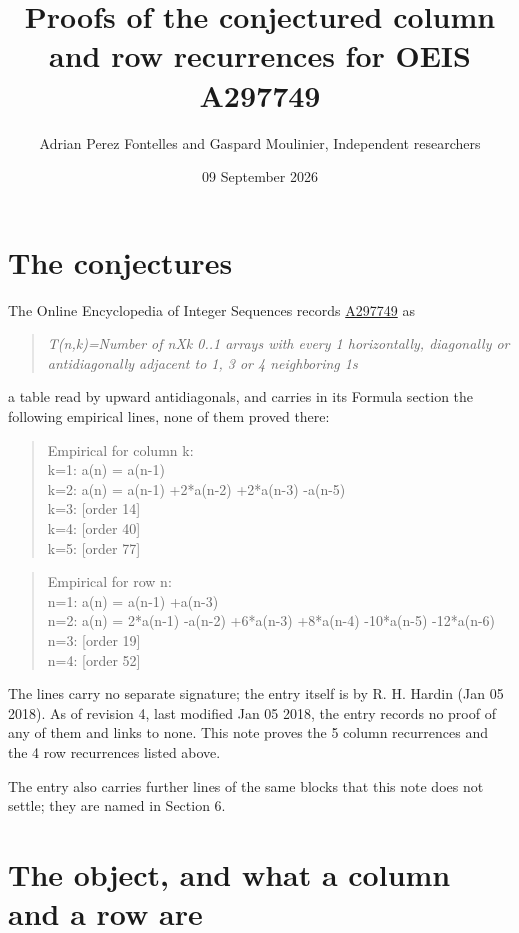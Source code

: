 \documentclass[11pt]{article}
\title{Proofs of the conjectured column and row recurrences for OEIS A297749}
\author{Adrian Perez Fontelles and Gaspard Moulinier, Independent researchers}
\date{09 September 2026}
\theoremstyle{definition}
\begin{document}
\maketitle
\section{The conjectures}

The Online Encyclopedia of Integer Sequences records \href{https://oeis.org/A297749}{A297749} as

\begin{quote}\itshape T(n,k)=Number of nXk 0..1 arrays with every 1 horizontally, diagonally or antidiagonally adjacent to 1, 3 or 4 neighboring 1s\end{quote}

a table read by upward antidiagonals, and carries in its Formula section the following empirical lines, none of them proved there:

\begin{quote}\ttfamily Empirical for column k:\\
k=1: a(n) = a(n-1)\\k=2: a(n) = a(n-1) +2*a(n-2) +2*a(n-3) -a(n-5)\\k=3: [order 14]\\k=4: [order 40]\\k=5: [order 77]\end{quote}

\begin{quote}\ttfamily Empirical for row n:\\
n=1: a(n) = a(n-1) +a(n-3)\\n=2: a(n) = 2*a(n-1) -a(n-2) +6*a(n-3) +8*a(n-4) -10*a(n-5) -12*a(n-6)\\n=3: [order 19]\\n=4: [order 52]\end{quote}

The lines carry no separate signature; the entry itself is by R. H. Hardin (Jan 05 2018). As of revision 4, last modified Jan 05 2018, the entry records no proof of any of them and links to none. This note proves the 5 column recurrences and the 4 row recurrences listed above.

The entry also carries further lines of the same blocks that this note does not settle; they are named in Section 6.

\section{The object, and what a column and a row are}
\end{document}
